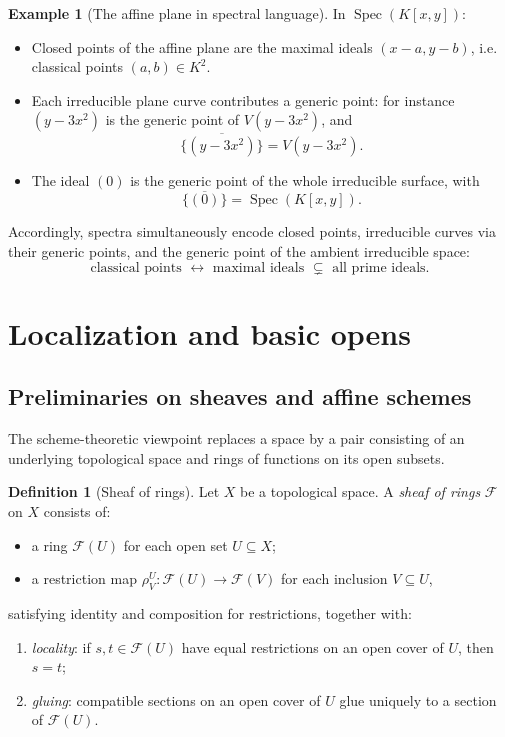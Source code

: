 \documentclass[12pt, a4paper]{article}
\theoremstyle{definition}
\newtheorem{definition}[theorem]{Definition}
\newtheorem{example}[theorem]{Example}
\DeclareMathOperator{\Spec}{Spec}
\begin{document}
\begin{example}[The affine plane in spectral language]
In $\Spec(K[x,y])$:
\begin{itemize}[leftmargin=2em]
    \item Closed points of the affine plane are the maximal ideals $(x-a,y-b)$, i.e. classical points $(a,b)\in K^2$.
    \item Each irreducible plane curve contributes a generic point: for instance $(y-3x^2)$ is the generic point of $V(y-3x^2)$, and
    \[
    \overline{\{(y-3x^2)\}}=V(y-3x^2).
    \]
    \item The ideal $(0)$ is the generic point of the whole irreducible surface, with
    \[
    \overline{\{(0)\}}=\Spec(K[x,y]).
    \]
\end{itemize}
Accordingly, spectra simultaneously encode closed points, irreducible curves via their generic points, and the generic point of the ambient irreducible space:
\[
\boxed{\text{classical points }\leftrightarrow\text{ maximal ideals }\subsetneq\text{ all prime ideals}.}
\]
\end{example}

\section{Localization and basic opens}

\subsection{Preliminaries on sheaves and affine schemes}

The scheme-theoretic viewpoint replaces a space by a pair consisting of an underlying topological space and rings of functions on its open subsets.

\begin{definition}[Sheaf of rings]
Let $X$ be a topological space. A \emph{sheaf of rings} $\mathcal F$ on $X$ consists of:
\begin{itemize}[leftmargin=2em]
    \item a ring $\mathcal F(U)$ for each open set $U\subseteq X$;
    \item a restriction map $\rho^U_V:\mathcal F(U)\to\mathcal F(V)$ for each inclusion $V\subseteq U$,
\end{itemize}
satisfying identity and composition for restrictions, together with:
\begin{enumerate}[label=(\roman*), leftmargin=2.5em]
    \item \emph{locality}: if $s,t\in\mathcal F(U)$ have equal restrictions on an open cover of $U$, then $s=t$;
    \item \emph{gluing}: compatible sections on an open cover of $U$ glue uniquely to a section of $\mathcal F(U)$.
\end{enumerate}
\end{definition}
\end{document}
